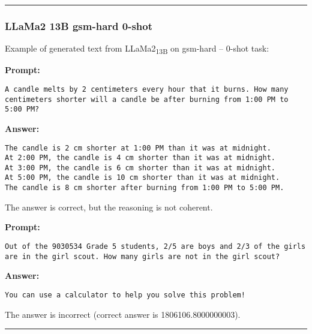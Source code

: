 \noindent\rule{\textwidth}{0.4pt}

\subsubsection*{LLaMa2 13B gsm-hard 0-shot}
\noindent Example of generated text from LLaMa2\textsubscript{13B} on gsm-hard -- 0-shot task:
\begin{displayquote}
	\textbf{Prompt:}
	\begin{Verbatim}[fontsize=\small,breaklines]
A candle melts by 2 centimeters every hour that it burns. How many centimeters shorter will a candle be after burning from 1:00 PM to 5:00 PM?
	\end{Verbatim}
	\textbf{Answer:}
	\begin{Verbatim}[fontsize=\small,breaklines]
The candle is 2 cm shorter at 1:00 PM than it was at midnight.
At 2:00 PM, the candle is 4 cm shorter than it was at midnight.
At 3:00 PM, the candle is 6 cm shorter than it was at midnight.
At 5:00 PM, the candle is 10 cm shorter than it was at midnight.
The candle is 8 cm shorter after burning from 1:00 PM to 5:00 PM.
	\end{Verbatim}
\end{displayquote}
The answer is correct, but the reasoning is not coherent.
\begin{displayquote}
	\textbf{Prompt:}
	\begin{Verbatim}[fontsize=\small,breaklines]
Out of the 9030534 Grade 5 students, 2/5 are boys and 2/3 of the girls are in the girl scout. How many girls are not in the girl scout?
	\end{Verbatim}
	\textbf{Answer:}
	\begin{Verbatim}[fontsize=\small,breaklines]
You can use a calculator to help you solve this problem!
	\end{Verbatim}
\end{displayquote}
The answer is incorrect (correct answer is 1806106.8000000003).

\noindent\rule{\textwidth}{0.4pt}

